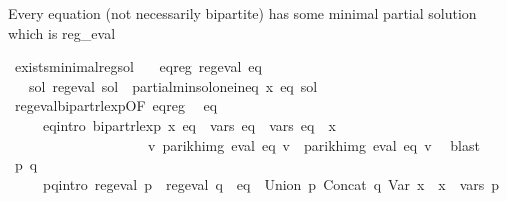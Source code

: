 \begin{isabellebody}
\endisatagproof
{\isafoldproof}%
%
\isadelimproof
\isanewline
%
\endisadelimproof
\isanewline
{}\isamarkupfalse%
%
\begin{isamarkuptext}%
Every equation (not necessarily bipartite) has some minimal partial solution which is reg_eval%
\end{isamarkuptext}\isamarkuptrue%
\isamarkupfalse%
\ exists{\isacharunderscore}{\kern0pt}minimal{\isacharunderscore}{\kern0pt}reg{\isacharunderscore}{\kern0pt}sol{\isacharcolon}{\kern0pt}\isanewline
\ \ \ eq{\isacharunderscore}{\kern0pt}reg{\isacharcolon}{\kern0pt}\ {\isachardoublequoteopen}reg{\isacharunderscore}{\kern0pt}eval\ eq{\isachardoublequoteclose}\isanewline
\ \ \ {\isachardoublequoteopen}{\isasymexists}sol{\isachardot}{\kern0pt}\ reg{\isacharunderscore}{\kern0pt}eval\ sol\ {\isasymand}\ partial{\isacharunderscore}{\kern0pt}min{\isacharunderscore}{\kern0pt}sol{\isacharunderscore}{\kern0pt}one{\isacharunderscore}{\kern0pt}ineq\ x\ eq\ sol{\isachardoublequoteclose}\isanewline
%
\isadelimproof
%
\endisadelimproof
%
\isatagproof
{}\isamarkupfalse%
\ {\isacharminus}{\kern0pt}\isanewline
\ \ \isamarkupfalse%
\ reg{\isacharunderscore}{\kern0pt}eval{\isacharunderscore}{\kern0pt}bipart{\isacharunderscore}{\kern0pt}rlexp{\isacharbrackleft}{\kern0pt}OF\ eq{\isacharunderscore}{\kern0pt}reg{\isacharbrackright}{\kern0pt}\ \isamarkupfalse%
\ eq{\isacharprime}{\kern0pt}\isanewline
\ \ \ \ \ eq{\isacharprime}{\kern0pt}{\isacharunderscore}{\kern0pt}intro{\isacharcolon}{\kern0pt}\ {\isachardoublequoteopen}bipart{\isacharunderscore}{\kern0pt}rlexp\ x\ eq{\isacharprime}{\kern0pt}\ {\isasymand}\ vars\ eq{\isacharprime}{\kern0pt}\ {\isacharequal}{\kern0pt}\ vars\ eq\ {\isasymunion}\ {\isacharbraceleft}{\kern0pt}x{\isacharbraceright}{\kern0pt}\ {\isasymand}\isanewline
\ \ \ \ \ \ \ \ \ \ \ \ \ \ \ \ \ \ \ \ {\isacharparenleft}{\kern0pt}{\isasymforall}v{\isachardot}{\kern0pt}\ parikh{\isacharunderscore}{\kern0pt}img\ {\isacharparenleft}{\kern0pt}eval\ eq\ v{\isacharparenright}{\kern0pt}\ {\isacharequal}{\kern0pt}\ parikh{\isacharunderscore}{\kern0pt}img\ {\isacharparenleft}{\kern0pt}eval\ eq{\isacharprime}{\kern0pt}\ v{\isacharparenright}{\kern0pt}{\isacharparenright}{\kern0pt}{\isachardoublequoteclose}\ \isamarkupfalse%
\ blast\isanewline
\ \ \isamarkupfalse%
\ \isamarkupfalse%
\ p\ q\isanewline
\ \ \ \ \ p{\isacharunderscore}{\kern0pt}q{\isacharunderscore}{\kern0pt}intro{\isacharcolon}{\kern0pt}\ {\isachardoublequoteopen}reg{\isacharunderscore}{\kern0pt}eval\ p\ {\isasymand}\ reg{\isacharunderscore}{\kern0pt}eval\ q\ {\isasymand}\ eq{\isacharprime}{\kern0pt}\ {\isacharequal}{\kern0pt}\ Union\ p\ {\isacharparenleft}{\kern0pt}Concat\ q\ {\isacharparenleft}{\kern0pt}Var\ x{\isacharparenright}{\kern0pt}{\isacharparenright}{\kern0pt}\ {\isasymand}\ x\ {\isasymnotin}\ vars\ p{\isachardoublequoteclose}\isanewline

\end{isabellebody}
